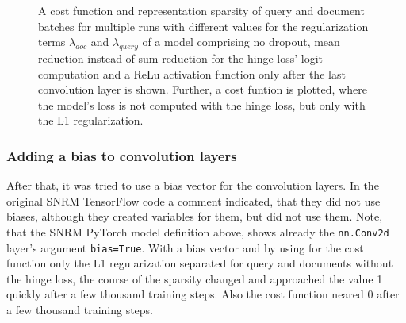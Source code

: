 \begin{figure}[htbp]
\caption[Cost functions and sparsity of multiple runs with different values of the regularization terms $\lambda_{doc}$ and $\lambda_{query}$ of a model comprising sum reduction for hinge loss' logits computation, no dropout and ReLu only after the last layer; Cost function where the model's loss is not computed with the hinge loss, but only with the L1 regularization]{A cost function and representation sparsity of query and document batches for multiple runs with different values for the regularization terms $\lambda_{doc}$ and $\lambda_{query}$ of a model comprising no dropout, mean reduction instead of sum reduction for the hinge loss' logit computation and a ReLu activation function only after the last convolution layer is shown. Further, a cost funtion is plotted, where the model's loss is not computed with the hinge loss, but only with the L1 regularization.}
\label{fig:2020-03-15:cost-fn-query-doc-repr-sparsity} %
\end{figure}

\subsubsection*{Adding a bias to convolution layers}
After that, it was tried to use a bias vector for the convolution layers.
In the original SNRM TensorFlow code a comment indicated, that they did not use biases,
    although they created variables for them, but did not use them.
Note, that the SNRM PyTorch model definition above, shows already the \texttt{nn.Conv2d} 
    layer's argument \texttt{bias=True}.
With a bias vector and by using for the cost function only the L1 regularization separated 
    for query and documents without the hinge loss,
    the course of the sparsity changed and approached the value 1 quickly after a few thousand 
    training steps.
Also the cost function neared 0 after a few thousand training steps.

